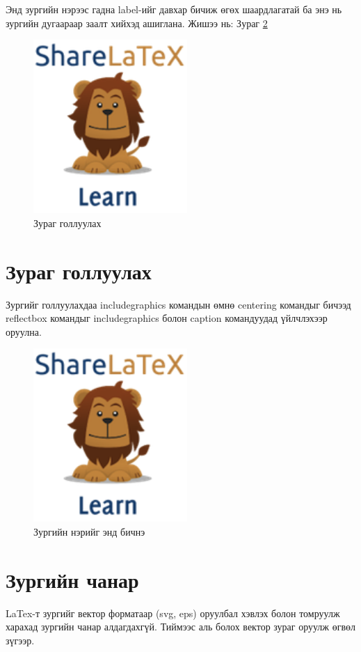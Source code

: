 Энд зургийн нэрээс гадна label-ийг давхар бичиж өгөх шаардлагатай ба энэ нь зургийн дугаараар заалт хийхэд ашиглана. Жишээ нь: Зураг \ref{fig:lion2}

\begin{figure}[h]
	\centering
	\includegraphics[scale=0.9]{figure01}
	\caption{Зураг голлуулах}
	\label{fig:lion1}
\end{figure}

\section{Зураг голлуулах}
Зургийг голлуулахдаа includegraphics командын өмнө centering
командыг бичээд reflectbox командыг includegraphics болон caption
командуудад үйлчлэхээр оруулна.

\begin{figure}[h]
	\includegraphics[scale=0.5]{figure01.png}
	\caption{Зургийн нэрийг энд бичнэ}

	\label{fig:lion2}
\end{figure}

\section{Зургийн чанар}
LaTex-т зургийг вектор форматаар (svg, eps) оруулбал хэвлэх болон томруулж харахад зургийн чанар
алдагдахгүй. Тиймээс аль болох вектор зураг оруулж өгвөл зүгээр.

